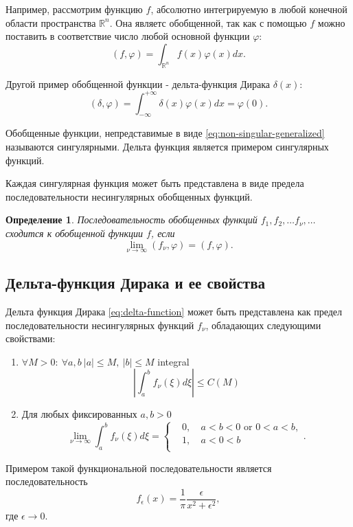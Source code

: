 \documentclass[11pt]{article}
\newtheorem{definition}{Определение}[section]
\begin{document}
Например, рассмотрим функцию $f$, абсолютно интегрируемую в любой конечной области пространства $\mathbb{R}^n$. Она являетс обобщенной, так как с помощью $f$  можно поставить в соответствие число любой основной функции $\varphi$:
\begin{equation}
(f, \varphi) = \int_{\mathbb{R}^n} f(x)\varphi(x) dx. \label{eq:non-singular-generalized}
\end{equation}

Другой пример обобщенной функции - дельта-функция Дирака $\delta(x)$:
\begin{equation}
(\delta, \varphi) = \int_{-\infty}^{+\infty} \delta(x)\varphi(x) dx = \varphi(0). \label{eq:delta-function}
\end{equation}

Обобщенные функции, непредставимые в виде \eqref{eq:non-singular-generalized} называются сингулярными. Дельта функция является примером сингулярных функций.

Каждая сингулярная функция может быть представлена в виде предела последовательности несингулярных обобщенных функций. 
\begin{definition}
Последовательность обобщенных функций $f_1, f_2,\ldots f_\nu,\ldots$ сходится к обобщенной функции $f$, если
\[
\lim_{\nu\to\infty} (f_\nu, \varphi) = (f, \varphi).
\]
\end{definition}

\subsection{Дельта-функция Дирака и ее свойства}

Дельта функция Дирака \eqref{eq:delta-function} может быть представлена как предел последовательности несингулярных функций $f_\nu$, обладающих следующими свойствами:
\begin{enumerate}
\item $\forall M > 0:\ \forall a, b\ |a| \leq M,\ |b| \leq M$ integral 
\[
 \left| \int_a^b f_\nu(\xi)d\xi \right| \leq C(M)
\]
\item Для любых фиксированных $a, b > 0$
\[
\lim_{\nu\to\infty} \int_a^bf_\nu(\xi)d\xi = \left\{
\begin{aligned}
&0,&\ a < b < 0 \mbox{ or } 0 < a < b,\\
&1,&\ a < 0 < b\\
\end{aligned} \right. .
\]
\end{enumerate}
Примером такой функциональной последовательности является последовательность 
\[
f_\epsilon(x) = \dfrac{1}{\pi} \dfrac{\epsilon}{x^2 + \epsilon^2},
\]
где $\epsilon\to 0$.
\end{document}
